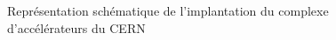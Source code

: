 \begin{figure}[htb]
\centering
{}
\caption{Représentation schématique de l'implantation du complexe d'accélérateurs du CERN}
\label{CERN}
\end{figure}
